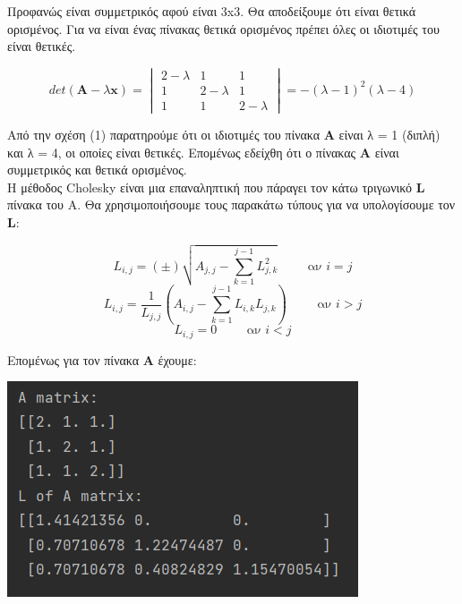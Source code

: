 \documentclass{article}
\begin{document}
Προφανώς είναι συμμετρικός αφού είναι 3x3. Θα αποδείξουμε ότι είναι θετικά ορισμένος. Για να είναι ένας πίνακας θετικά ορισμένος πρέπει όλες οι ιδιοτιμές του είναι θετικές.

\begin{center}
    \begin{equation}
        det(\textbf{A} - λ\textbf{x}) = \begin{vmatrix} 2-λ & 1 & 1\\ 1 & 2-λ & 1\\ 1 & 1 & 2-λ \end{vmatrix} = -(λ-1)^2(λ-4)
    \end{equation}
\end{center}

Από την σχέση (1) παρατηρούμε ότι οι ιδιοτιμές του πίνακα \textbf{Α} είναι λ = 1 (διπλή) και λ = 4, οι οποίες είναι θετικές. Επομένως εδείχθη ότι ο πίνακας \textbf{Α} είναι συμμετρικός και θετικά ορισμένος. \\

Η μέθοδος Cholesky είναι μια επαναληπτική που πάραγει τον κάτω τριγωνικό \textbf{L} πίνακα του Α. Θα χρησιμοποιήσουμε τους παρακάτω τύπους για να υπολογίσουμε τον \textbf{L}:

\begin{center}
    \begin{equation*}
        L_{i,j} = (\pm) \sqrt{A_{j,j} - \sum_{k=1}^{j-1} L^2_{j,k}} \hspace{1cm} \text{αν \(i=j\)}
    \end{equation*}
    \begin{equation*}
        L_{i,j} = \frac{1}{L_{j,j}} (A_{i,j} - \sum_{k=1}^{j-1} L_{i,k}L_{j,k})   \hspace{1cm} \text{αν \(i>j\)}
    \end{equation*}
    \begin{equation*}
        L_{i,j} = 0 \hspace{1cm} \text{αν \(i<j\)}
    \end{equation*}
\end{center}

Επομένως για τον πίνακα \textbf{A} έχουμε: \\
\begin{center}\includegraphics[]{images/results_7.png}\end{center}
\end{document}
